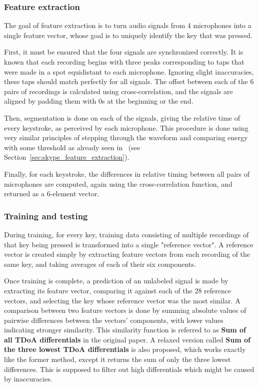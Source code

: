 \documentclass[../main.tex]{subfiles}
\begin{document}
\subsubsection{Feature extraction}\label{sec:nakken_feature_extraction}
The goal of feature extraction is to turn audio signals from 4 microphones
into a single feature vector, whose goal is to uniquely identify the key that
was pressed.

First, it must be ensured that the four signals are synchronized correctly. It is
known that each recording begins with three peaks corresponding to taps that were made
in a spot equidistant to each microphone. Ignoring slight inaccuracies, these taps
should match perfectly for all signals. The offset between each of the 6 pairs of
recordings is calculated using cross-correlation, and the signals are aligned
by padding them with 0s at the beginning or the end.

Then, segmentation is done on each of the signals, giving the relative time of every
keystroke, as perceived by each microphone. This procedure is done using very similar
principles of stepping through the waveform and comparing energy with some threshold
as already seen in~\cite{skype2019} (see Section~\ref{sec:skype_feature_extraction}).

Finally, for each keystroke, the differences in relative timing between all pairs
of microphones are computed, again using the cross-correlation function, and returned
as a 6-element vector.

\subsubsection{Training and testing}\label{sec:nakken_training_and_testing}
During training, for every key, training data consisting of multiple recordings of
that key being pressed is transformed into a single "reference vector". A reference
vector is created simply by extracting feature vectors from each recording of the
same key, and taking averages of each of their six components.

Once training is complete, a prediction of an unlabeled signal is made by extracting
its feature vector, comparing it against each of the 28 reference vectors, and selecting
the key whose reference vector was the most similar. A comparison between two feature
vectors is done by summing absolute values of pairwise differences between the vectors'
components, with lower values indicating stronger similarity. This similarity function
is referred to as \textbf{Sum of all TDoA differentials} in the original paper.
A relaxed version called \textbf{Sum of the three lowest TDoA differentials} is also
proposed, which works exactly like the former method, except it returns the sum
of only the three lowest differences. This is supposed to filter out high differentials
which might be caused by inaccuracies.
\end{document}
